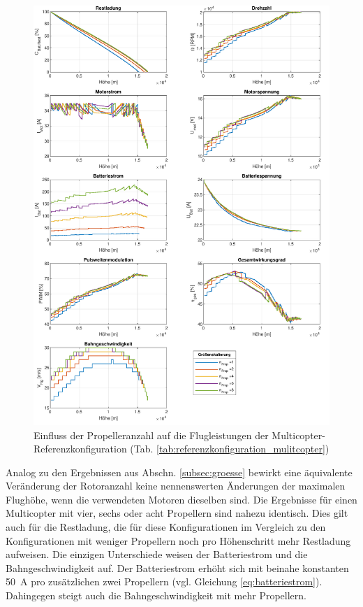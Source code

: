 \begin{figure}[H]
	\includegraphics[scale=0.7]{Diagramme/Anz_Prop.pdf}
	\caption{Einfluss der Propelleranzahl auf die Flugleistungen der Multicopter-Referenzkonfiguration (Tab. \ref{tab:referenzkonfiguration_mulitcopter})}
	\label{abb:groessenskalierung}
\end{figure}
Analog zu den Ergebnissen aus Abschn. \ref{subsec:groesse} bewirkt eine äquivalente Veränderung der Rotoranzahl keine nennenswerten Änderungen der maximalen Flughöhe, wenn die verwendeten Motoren dieselben sind. Die Ergebnisse für einen Multicopter mit vier, sechs oder acht Propellern sind nahezu identisch. Dies gilt auch für die Restladung, die für diese Konfigurationen im Vergleich zu den Konfigurationen mit weniger Propellern noch pro Höhenschritt mehr Restladung aufweisen. Die einzigen Unterschiede weisen der Batteriestrom und die Bahngeschwindigkeit auf. Der Batteriestrom erhöht sich mit beinahe konstanten \SI{50}{A} pro zusätzlichen zwei Propellern (vgl. Gleichung \eqref{eq:batteriestrom}). Dahingegen steigt auch die Bahngeschwindigkeit mit mehr Propellern. \\
